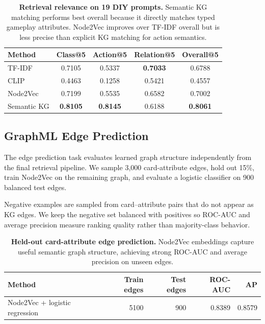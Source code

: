 \documentclass{article}
\begin{document}
\begin{table}[t]
\centering
\small
\begin{tabular}{lcccc}
\toprule
\textbf{Method} & \textbf{Class@5} & \textbf{Action@5} & \textbf{Relation@5} & \textbf{Overall@5}\\
\midrule
TF-IDF & 0.7105 & 0.5337 & \textbf{0.7033} & 0.6788\\
CLIP & 0.4463 & 0.1258 & 0.5421 & 0.4557\\
Node2Vec & 0.7199 & 0.5535 & 0.6582 & 0.7002\\
Semantic KG & \textbf{0.8105} & \textbf{0.8145} & 0.6188 & \textbf{0.8061}\\
\bottomrule
\end{tabular}
\caption{\textbf{Retrieval relevance on 19 DIY prompts.} Semantic KG matching performs best overall because it directly matches typed gameplay attributes. Node2Vec improves over TF-IDF overall but is less precise than explicit KG matching for action semantics.}
\label{tab:retrieval}
\end{table}

\subsection{GraphML Edge Prediction}

The edge prediction task evaluates learned graph structure independently from the final retrieval pipeline. We sample 3,000 card-attribute edges, hold out 15\%, train Node2Vec on the remaining graph, and evaluate a logistic classifier on 900 balanced test edges.

Negative examples are sampled from card--attribute pairs that do not appear as KG edges. We keep the negative set balanced with positives so ROC-AUC and average precision measure ranking quality rather than majority-class behavior.

\begin{table}[t]
\centering
\small
\begin{tabular}{lrrrr}
\toprule
\textbf{Method} & \textbf{Train edges} & \textbf{Test edges} & \textbf{ROC-AUC} & \textbf{AP}\\
\midrule
Node2Vec + logistic regression & 5100 & 900 & 0.8389 & 0.8579\\
\bottomrule
\end{tabular}
\caption{\textbf{Held-out card-attribute edge prediction.} Node2Vec embeddings capture useful semantic graph structure, achieving strong ROC-AUC and average precision on unseen edges.}
\label{tab:link_prediction}
\end{table}
\end{document}
